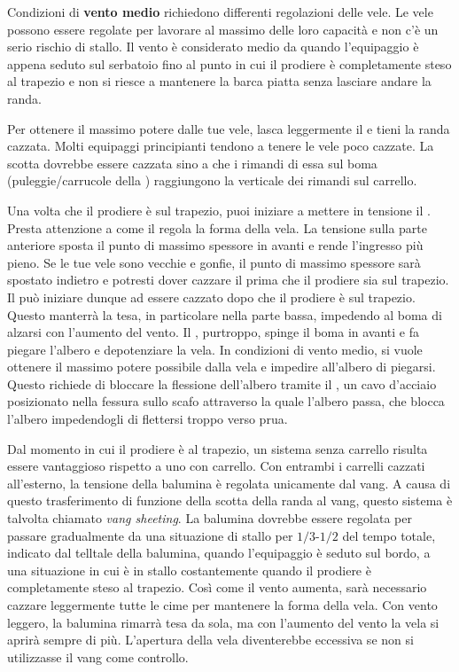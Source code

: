 Condizioni di \textbf{vento medio} richiedono differenti regolazioni delle vele.
Le vele possono essere regolate per lavorare al massimo delle loro capacità e
non c'è un serio rischio di stallo. Il vento è considerato medio da quando
l'equipaggio è appena seduto sul serbatoio \windward fino al punto in cui il
prodiere è completamente steso al trapezio e non si riesce a mantenere la
barca piatta senza lasciare andare la randa.

Per ottenere il massimo potere dalle tue vele, lasca leggermente il \outhaul e
tieni la randa cazzata. Molti equipaggi principianti tendono a tenere le
vele poco cazzate. La scotta dovrebbe essere cazzata sino a che i rimandi di
essa sul boma (puleggie/carrucole della \sheet) raggiungono la verticale dei
rimandi sul carrello.

Una volta che il prodiere è sul trapezio, puoi iniziare a mettere in tensione il
\cunningham. Presta attenzione a come il \cunningham regola la forma della vela.
La tensione sulla parte anteriore sposta il punto di massimo spessore in avanti
e rende l'ingresso più pieno. Se le tue vele sono vecchie e gonfie, il punto di
massimo spessore sarà spostato indietro e potresti dover cazzare il \cunningham
prima che il prodiere sia sul trapezio. Il \vang può iniziare dunque ad essere
cazzato dopo che il prodiere è sul trapezio. Questo manterrà la \leech tesa,
in particolare nella parte bassa, impedendo al boma di alzarsi con l'aumento del
vento. Il \vang, purtroppo, spinge il boma in avanti e fa piegare l'albero e
depotenziare la vela. In condizioni di vento medio, si vuole ottenere il massimo
potere possibile dalla vela e impedire all'albero di piegarsi. Questo richiede
di bloccare la flessione dell'albero tramite il \mastpull, un cavo d'acciaio
posizionato nella fessura sullo scafo attraverso la quale l'albero passa,
che blocca l'albero impedendogli di flettersi troppo verso prua.

Dal momento in cui il prodiere è al trapezio, un sistema senza carrello risulta
essere vantaggioso rispetto a uno con carrello. Con entrambi i carrelli cazzati
all'esterno, la tensione della balumina è regolata unicamente dal vang. A causa
di questo trasferimento di funzione della scotta della randa al vang, questo
sistema è talvolta chiamato \emph{vang sheeting}. La balumina dovrebbe essere
regolata per passare gradualmente da una situazione di stallo per $1/3$-$1/2$
del tempo totale, indicato dal telltale della balumina, quando l'equipaggio è
seduto sul bordo, a una situazione in cui è in stallo costantemente quando il
prodiere è completamente steso al trapezio. Così come il vento aumenta, sarà
necessario cazzare leggermente tutte le cime per mantenere la forma della vela.
Con vento leggero, la balumina rimarrà tesa da sola, ma con l'aumento del vento
la vela si aprirà sempre di più. L'apertura della vela diventerebbe eccessiva se
non si utilizzasse il vang come controllo.

